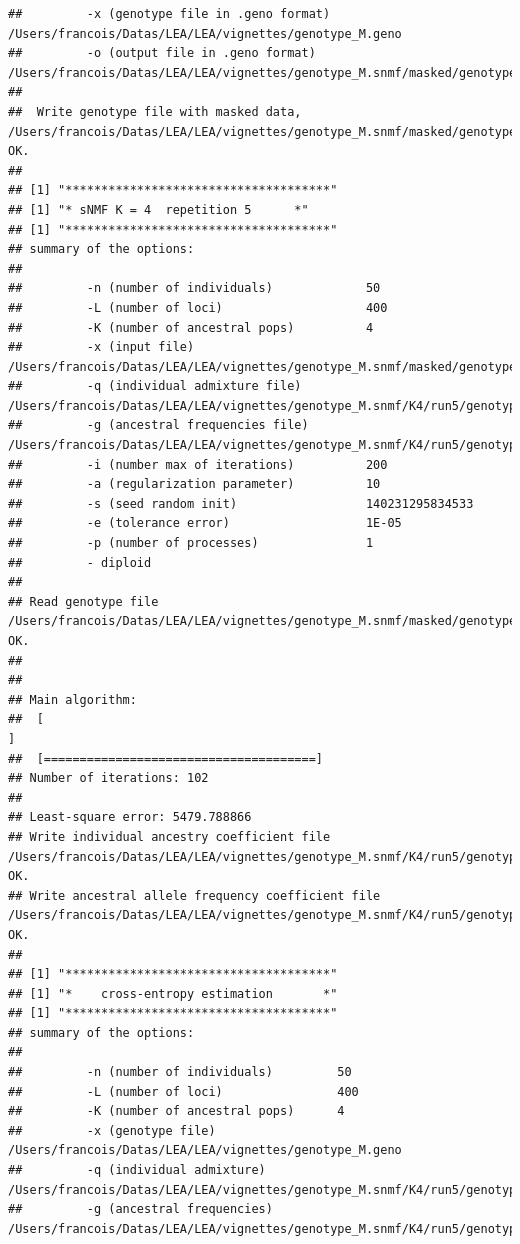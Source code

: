 \documentclass[12pt,a4paper,oneside]{article}\usepackage[]{graphicx}\usepackage[]{color}
\makeatletter
\newenvironment{kframe}{%
 \def\at@end@of@kframe{}%
 \ifinner\ifhmode%
  \def\at@end@of@kframe{\end{minipage}}%
  \begin{minipage}{\columnwidth}%
 \fi\fi%
 \def\FrameCommand##1{\hskip\@totalleftmargin \hskip-\fboxsep
 \colorbox{shadecolor}{##1}\hskip-\fboxsep
     \hskip-\linewidth \hskip-\@totalleftmargin \hskip\columnwidth}%
 \MakeFramed {\advance\hsize-\width
   \@totalleftmargin\z@ \linewidth\hsize
   \@setminipage}}%
 {\par\unskip\endMakeFramed%
 \at@end@of@kframe}
\newenvironment{knitrout}{}{} %
\makeatother
\begin{document}
\begin{knitrout}
\begin{kframe}
\begin{verbatim}
##         -x (genotype file in .geno format)         /Users/francois/Datas/LEA/LEA/vignettes/genotype_M.geno
##         -o (output file in .geno format)           /Users/francois/Datas/LEA/LEA/vignettes/genotype_M.snmf/masked/genotype_M_I.geno
## 
##  Write genotype file with masked data, /Users/francois/Datas/LEA/LEA/vignettes/genotype_M.snmf/masked/genotype_M_I.geno:		OK.
## 
## [1] "*************************************"
## [1] "* sNMF K = 4  repetition 5      *"
## [1] "*************************************"
## summary of the options:
## 
##         -n (number of individuals)             50
##         -L (number of loci)                    400
##         -K (number of ancestral pops)          4
##         -x (input file)                        /Users/francois/Datas/LEA/LEA/vignettes/genotype_M.snmf/masked/genotype_M_I.geno
##         -q (individual admixture file)         /Users/francois/Datas/LEA/LEA/vignettes/genotype_M.snmf/K4/run5/genotype_M_r5.4.Q
##         -g (ancestral frequencies file)        /Users/francois/Datas/LEA/LEA/vignettes/genotype_M.snmf/K4/run5/genotype_M_r5.4.G
##         -i (number max of iterations)          200
##         -a (regularization parameter)          10
##         -s (seed random init)                  140231295834533
##         -e (tolerance error)                   1E-05
##         -p (number of processes)               1
##         - diploid
## 
## Read genotype file /Users/francois/Datas/LEA/LEA/vignettes/genotype_M.snmf/masked/genotype_M_I.geno:		OK.
## 
## 
## Main algorithm:
## 	[                                                                           ]
## 	[======================================]
## Number of iterations: 102
## 
## Least-square error: 5479.788866
## Write individual ancestry coefficient file /Users/francois/Datas/LEA/LEA/vignettes/genotype_M.snmf/K4/run5/genotype_M_r5.4.Q:		OK.
## Write ancestral allele frequency coefficient file /Users/francois/Datas/LEA/LEA/vignettes/genotype_M.snmf/K4/run5/genotype_M_r5.4.G:	OK.
## 
## [1] "*************************************"
## [1] "*    cross-entropy estimation       *"
## [1] "*************************************"
## summary of the options:
## 
##         -n (number of individuals)         50
##         -L (number of loci)                400
##         -K (number of ancestral pops)      4
##         -x (genotype file)                 /Users/francois/Datas/LEA/LEA/vignettes/genotype_M.geno
##         -q (individual admixture)          /Users/francois/Datas/LEA/LEA/vignettes/genotype_M.snmf/K4/run5/genotype_M_r5.4.Q
##         -g (ancestral frequencies)         /Users/francois/Datas/LEA/LEA/vignettes/genotype_M.snmf/K4/run5/genotype_M_r5.4.G

\end{verbatim}
\end{kframe}
\end{knitrout}
\end{document}

